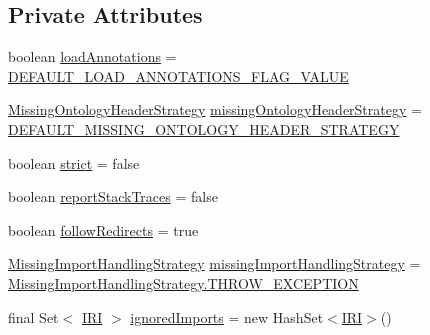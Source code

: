 \subsection*{Private Attributes}
\begin{DoxyCompactItemize}
\item 
boolean \hyperlink{classorg_1_1semanticweb_1_1owlapi_1_1model_1_1_o_w_l_ontology_loader_configuration_acdd29ba8b5e0089f9cedff6b5d526fa8}{load\-Annotations} = \hyperlink{classorg_1_1semanticweb_1_1owlapi_1_1model_1_1_o_w_l_ontology_loader_configuration_a8e741d86fac5796d80a0d3aeece08c1c}{D\-E\-F\-A\-U\-L\-T\-\_\-\-L\-O\-A\-D\-\_\-\-A\-N\-N\-O\-T\-A\-T\-I\-O\-N\-S\-\_\-\-F\-L\-A\-G\-\_\-\-V\-A\-L\-U\-E}
\item 
\hyperlink{enumorg_1_1semanticweb_1_1owlapi_1_1model_1_1_o_w_l_ontology_loader_configuration_1_1_missing_ontology_header_strategy}{Missing\-Ontology\-Header\-Strategy} \hyperlink{classorg_1_1semanticweb_1_1owlapi_1_1model_1_1_o_w_l_ontology_loader_configuration_a84e5201747f569e881d0994924b2ee6b}{missing\-Ontology\-Header\-Strategy} = \hyperlink{classorg_1_1semanticweb_1_1owlapi_1_1model_1_1_o_w_l_ontology_loader_configuration_af04a4aa0fa85110a9390bc40043cd94f}{D\-E\-F\-A\-U\-L\-T\-\_\-\-M\-I\-S\-S\-I\-N\-G\-\_\-\-O\-N\-T\-O\-L\-O\-G\-Y\-\_\-\-H\-E\-A\-D\-E\-R\-\_\-\-S\-T\-R\-A\-T\-E\-G\-Y}
\item 
boolean \hyperlink{classorg_1_1semanticweb_1_1owlapi_1_1model_1_1_o_w_l_ontology_loader_configuration_ac8f2deb760c66c3d3bf620074b74e05b}{strict} = false
\item 
boolean \hyperlink{classorg_1_1semanticweb_1_1owlapi_1_1model_1_1_o_w_l_ontology_loader_configuration_af2df0eb7f91708fc967171570ca1ae91}{report\-Stack\-Traces} = false
\item 
boolean \hyperlink{classorg_1_1semanticweb_1_1owlapi_1_1model_1_1_o_w_l_ontology_loader_configuration_a3b71c1e46846e2b46eebfdc5e95e742e}{follow\-Redirects} = true
\item 
\hyperlink{enumorg_1_1semanticweb_1_1owlapi_1_1model_1_1_missing_import_handling_strategy}{Missing\-Import\-Handling\-Strategy} \hyperlink{classorg_1_1semanticweb_1_1owlapi_1_1model_1_1_o_w_l_ontology_loader_configuration_a31378553cdc28a0a8143f6eca4579e2d}{missing\-Import\-Handling\-Strategy} = \hyperlink{enumorg_1_1semanticweb_1_1owlapi_1_1model_1_1_missing_import_handling_strategy_a28783f8ec58145f2d48186f718570163}{Missing\-Import\-Handling\-Strategy.\-T\-H\-R\-O\-W\-\_\-\-E\-X\-C\-E\-P\-T\-I\-O\-N}
\item 
final Set$<$ \hyperlink{classorg_1_1semanticweb_1_1owlapi_1_1model_1_1_i_r_i}{I\-R\-I} $>$ \hyperlink{classorg_1_1semanticweb_1_1owlapi_1_1model_1_1_o_w_l_ontology_loader_configuration_aa6e67eedad5807d7530507804d516df0}{ignored\-Imports} = new Hash\-Set$<$\hyperlink{classorg_1_1semanticweb_1_1owlapi_1_1model_1_1_i_r_i}{I\-R\-I}$>$()
\end{DoxyCompactItemize}


